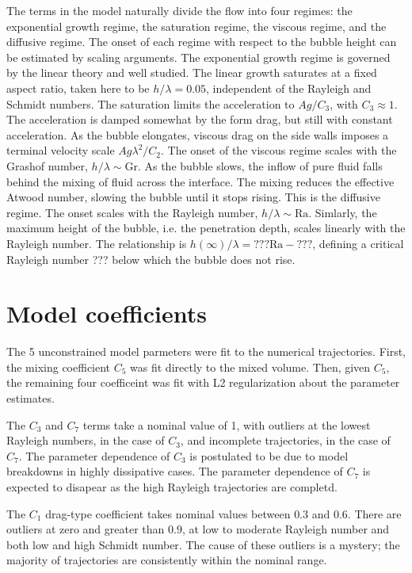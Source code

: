 The terms in the model naturally divide the flow into four regimes: the exponential growth regime, the saturation regime, the viscous regime, and the diffusive regime.
The onset of each regime with respect to the bubble height can be estimated by scaling arguments.
The exponential growth regime is governed by the linear theory and well studied.
The linear growth saturates at a fixed aspect ratio, taken here to be $h / \lambda = 0.05$, independent of the Rayleigh and Schmidt numbers. 
The saturation limits the acceleration to $A g / C_3$, with $C_3 \approx 1$.
The acceleration is damped somewhat by the form drag, but still with constant acceleration.
As the bubble elongates, viscous drag on the side walls imposes a terminal velocity scale $A g \lambda^2 / C_2$.
The onset of the viscous regime scales with the Grashof number, $h / \lambda \sim \text{Gr}$.
As the bubble slows, the inflow of pure fluid falls behind the mixing of fluid across the interface.
The mixing reduces the effective Atwood number, slowing the bubble until it stops rising.
This is the diffusive regime.
The onset scales with the Rayleigh number, $h / \lambda \sim \text{Ra}$.
Simlarly, the maximum height of the bubble, i.e. the penetration depth, scales linearly with the Rayleigh number.
The relationship is $h(\infty)/\lambda = ??? \text{Ra} - ???$, defining a critical Rayleigh number ??? below which the bubble does not rise.

\section{Model coefficients}

The 5 unconstrained model parmeters were fit to the numerical trajectories.
First, the mixing coefficient $C_5$ was fit directly to the mixed volume.
Then, given $C_5$, the remaining four coefficeint was fit with L2 regularization about the parameter estimates.

The $C_3$ and $C_7$ terms take a nominal value of 1, with outliers at the lowest Rayleigh numbers, in the case of $C_3$, and incomplete trajectories, in the case of $C_7$.
The parameter dependence of $C_3$ is postulated to be due to model breakdowns in highly dissipative cases.
The parameter dependence of $C_7$ is expected to disapear as the high Rayleigh trajectories are completd.

The $C_1$ drag-type coefficient takes nominal values between $0.3$ and $0.6$.
There are outliers at zero and greater than $0.9$, at low to moderate Rayleigh number and both low and high Schmidt number.
The cause of these outliers is a mystery; the majority of trajectories are consistently within the nominal range.

